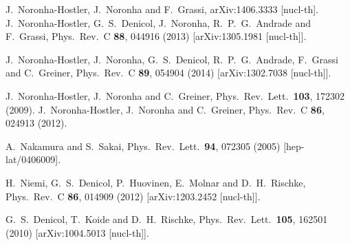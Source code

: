 \begin{thebibliography}{99}


  J.~Noronha-Hostler, J.~Noronha and F.~Grassi,
  arXiv:1406.3333 [nucl-th].
  J.~Noronha-Hostler, G.~S.~Denicol, J.~Noronha, R.~P.~G.~Andrade and F.~Grassi,
  Phys.\ Rev.\ C {\bf 88}, 044916 (2013)
  [arXiv:1305.1981 [nucl-th]].

  J.~Noronha-Hostler, J.~Noronha, G.~S.~Denicol, R.~P.~G.~Andrade, F.~Grassi and C.~Greiner,
  Phys.\ Rev.\ C {\bf 89}, 054904 (2014)
  [arXiv:1302.7038 [nucl-th]].
  
  
  J.~Noronha-Hostler, J.~Noronha and C.~Greiner,
  Phys.\ Rev.\ Lett.\  {\bf 103}, 172302 (2009).
  J.~Noronha-Hostler, J.~Noronha and C.~Greiner,
  Phys.\ Rev.\ C {\bf 86}, 024913 (2012).
  
  A.~Nakamura and S.~Sakai,
  Phys.\ Rev.\ Lett.\  {\bf 94}, 072305 (2005)
  [hep-lat/0406009].
  
  H.~Niemi, G.~S.~Denicol, P.~Huovinen, E.~Molnar and D.~H.~Rischke,
  Phys.\ Rev.\ C {\bf 86}, 014909 (2012)
  [arXiv:1203.2452 [nucl-th]].
  
  G.~S.~Denicol, T.~Koide and D.~H.~Rischke,
  Phys.\ Rev.\ Lett.\  {\bf 105}, 162501 (2010)
  [arXiv:1004.5013 [nucl-th]].
  

\end{thebibliography}
